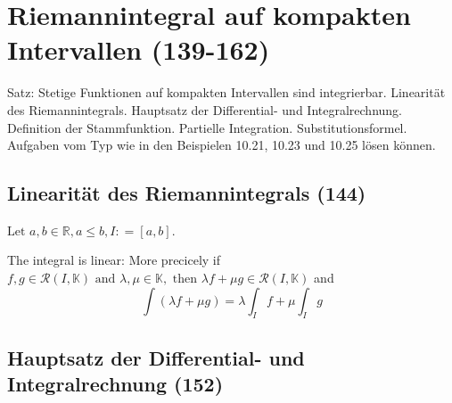 \section{Riemannintegral auf kompakten Intervallen (139-162)}
 
Satz: Stetige Funktionen auf kompakten Intervallen sind integrierbar. Linearität des Riemannintegrals. Hauptsatz der Differential- und Integralrechnung. Definition der Stammfunktion. Partielle Integration. Substitutionsformel. Aufgaben vom Typ wie in den Beispielen 10.21, 10.23 und 10.25 lösen können.


\subsection{Linearität des Riemannintegrals (144)}
$\text{Let } a ,b \in \mathbb { R } ,a \leq b ,I : = [ a ,b ]$.

The integral is linear: More precicely if $f ,g \in \mathcal { R } ( I ,\mathbb { K } ) \text{ and } \lambda ,\mu \in \mathbb { K } ,\text{ then } \lambda f + \mu g \in \mathcal { R } ( I ,\mathbb { K } )$ and 
\begin{equation}
\int ( \lambda f + \mu g ) = \lambda \int _ { I } f + \mu \int _ { I } g
\end{equation}


\subsection{Hauptsatz der Differential- und Integralrechnung (152)}

